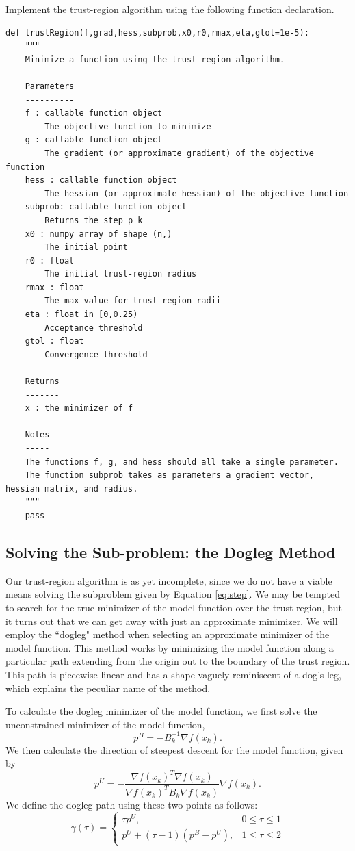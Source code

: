 \begin{problem}
Implement the trust-region algorithm using the following function declaration.
\begin{lstlisting}
def trustRegion(f,grad,hess,subprob,x0,r0,rmax,eta,gtol=1e-5):
    """
    Minimize a function using the trust-region algorithm.
    
    Parameters
    ----------
    f : callable function object
        The objective function to minimize
    g : callable function object
        The gradient (or approximate gradient) of the objective function
    hess : callable function object
        The hessian (or approximate hessian) of the objective function
    subprob: callable function object
        Returns the step p_k
    x0 : numpy array of shape (n,)
        The initial point
    r0 : float
        The initial trust-region radius
    rmax : float
        The max value for trust-region radii
    eta : float in [0,0.25)
        Acceptance threshold
    gtol : float
        Convergence threshold
        
    Returns
    -------
    x : the minimizer of f
    
    Notes
    -----
    The functions f, g, and hess should all take a single parameter.
    The function subprob takes as parameters a gradient vector, hessian matrix, and radius. 
    """
    pass
\end{lstlisting}
\end{problem}

\subsection*{Solving the Sub-problem: the Dogleg Method}
Our trust-region algorithm is as yet incomplete, since we do not have a viable means solving the subproblem 
given by Equation \ref{eq:step}.
We may be tempted to search for the true minimizer of the model function over the trust region, but it turns out
that we can get away with just an approximate minimizer. 
We will employ the ``dogleg" method when selecting an approximate minimizer of the model function. 
This method works by minimizing the model function along a particular path extending from the origin out
to the boundary of the trust region. 
This path is piecewise linear and has a shape vaguely reminiscent of a dog's leg, which explains the peculiar name of the method.

To calculate the dogleg minimizer of the model function, we first solve the unconstrained minimizer of the model function,
\[
p^B = -B_k^{-1}\nabla f(x_k).
\]
We then calculate the direction of steepest descent for the model function, given by
\[
p^U = -\frac{\nabla f(x_k)^T\nabla f(x_k)}{\nabla f(x_k)^TB_k\nabla f(x_k)}\nabla f(x_k).
\]
We define the dogleg path using these two points as follows:
\[
\gamma(\tau) =  \left\{
     \begin{array}{lr}
       \tau p^U, & 0\leq \tau \leq 1\\
       p^U+(\tau-1)(p^B-p^U), & 1\leq \tau\leq 2
     \end{array}
   \right.
\]

